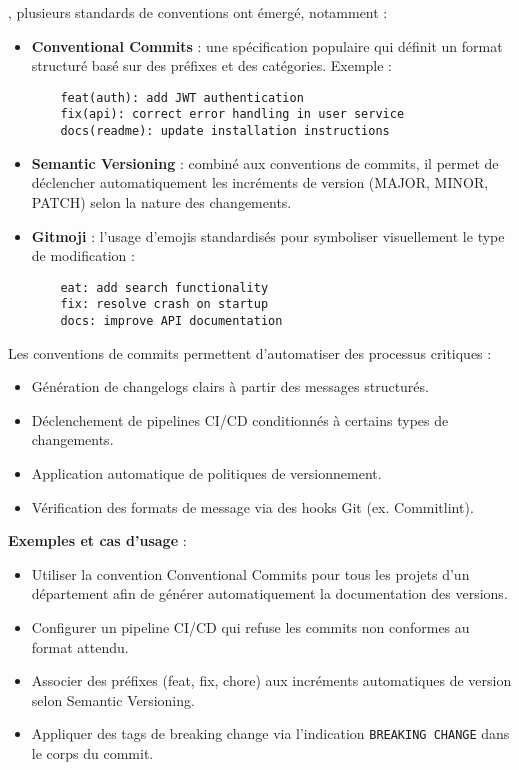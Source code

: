 , plusieurs standards de conventions ont émergé, notamment :
\begin{itemize}
	\item \textbf{Conventional Commits} : une spécification populaire qui définit un format structuré basé sur des préfixes et des catégories. Exemple :
	      \begin{verbatim}
    feat(auth): add JWT authentication
    fix(api): correct error handling in user service
    docs(readme): update installation instructions
	      \end{verbatim}
	\item \textbf{Semantic Versioning} : combiné aux conventions de commits, il permet de déclencher automatiquement les incréments de version (MAJOR, MINOR, PATCH) selon la nature des changements.
	\item \textbf{Gitmoji} : l’usage d’emojis standardisés pour symboliser visuellement le type de modification :
	      \begin{verbatim}
    eat: add search functionality
    fix: resolve crash on startup
    docs: improve API documentation
	      \end{verbatim}
\end{itemize}

Les conventions de commits permettent d’automatiser des processus critiques :
\begin{itemize}
	\item Génération de changelogs clairs à partir des messages structurés.
	\item Déclenchement de pipelines CI/CD conditionnés à certains types de changements.
	\item Application automatique de politiques de versionnement.
	\item Vérification des formats de message via des hooks Git (ex. Commitlint).
\end{itemize}

\textbf{Exemples et cas d’usage} :
\begin{itemize}
	\item Utiliser la convention Conventional Commits pour tous les projets d’un département afin de générer automatiquement la documentation des versions.
	\item Configurer un pipeline CI/CD qui refuse les commits non conformes au format attendu.
	\item Associer des préfixes (feat, fix, chore) aux incréments automatiques de version selon Semantic Versioning.
	\item Appliquer des tags de breaking change via l’indication \texttt{BREAKING CHANGE} dans le corps du commit.
\end{itemize}


